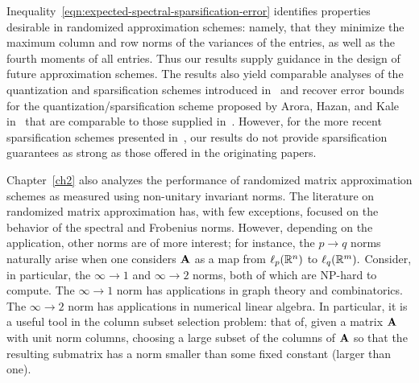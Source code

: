 Inequality~\eqref{eqn:expected-spectral-sparsification-error} identifies 
properties desirable in randomized approximation schemes: namely, that they 
minimize the maximum column and row norms of the variances of the entries, 
as well as the fourth moments of all entries. Thus our results supply guidance in the 
design of future approximation schemes. The results also yield comparable analyses of 
the quantization and sparsification schemes introduced in~\cite{AM01,AM07}
and recover error bounds for the quantization/sparsification scheme
proposed by Arora, Hazan, and Kale in~\cite{AHK06} that are comparable
to those supplied in~\cite{AHK06}. However, for the more recent sparsification schemes
presented in~\cite{DNT10,DZ11,AKL13}, our results do not provide
sparsification guarantees as strong as those offered in the originating papers.

Chapter~\ref{ch2} also analyzes the performance of randomized matrix 
approximation schemes as measured using non-unitary invariant norms. The 
literature on randomized matrix approximation has, with few exceptions, focused
on the behavior of the spectral and Frobenius norms. However, depending on 
the application, other norms are of more interest; for instance, the 
$p \rightarrow q$ norms naturally arise when one considers $\mathbf{A}$ as a map 
from $\ell_p(\mathbb{R}^n)$ to $\ell_q(\mathbb{R}^m).$ 
Consider, in particular, the $\infty \rightarrow 1$ and $\infty \rightarrow 2$ 
norms, both of which are NP-hard to compute. The $\infty \rightarrow 1$ norm has 
applications in graph theory and combinatorics. The $\infty \rightarrow 2$ norm has applications in numerical linear algebra. 
In particular, it is a useful tool in the column subset selection problem: that of,
given a matrix $\mathbf{A}$ with unit norm columns, choosing a large subset of the 
columns of $\mathbf{A}$ so that the resulting submatrix has a norm smaller than some 
fixed constant (larger than one). 

